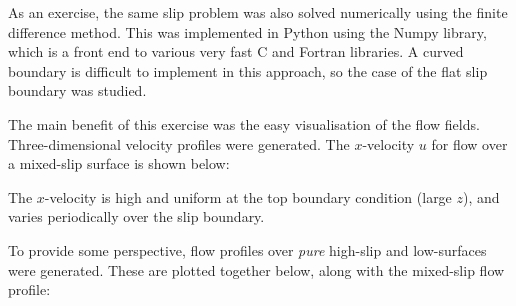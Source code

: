 \documentclass[a4paper]{report}
\begin{document}
As an exercise, the same slip problem was also solved numerically using the finite difference method.  This was implemented in Python using the Numpy library, which is a front end to various very fast C and Fortran libraries.  A curved boundary is difficult to implement in this approach, so the case of the flat slip boundary was studied.

The main benefit of this exercise was the easy visualisation of the flow fields. Three-dimensional velocity profiles were generated.  The $x$-velocity $u$ for flow over a mixed-slip surface is shown below:


\begin{center}
\end{center}


The $x$-velocity is high and uniform at the top boundary condition (large $z$), and varies periodically over the slip boundary.

\vspace{1em}
To provide some perspective, flow profiles over \emph{pure} high-slip and low-surfaces were generated.  These are plotted together below, along with the mixed-slip flow profile:
\end{document}
